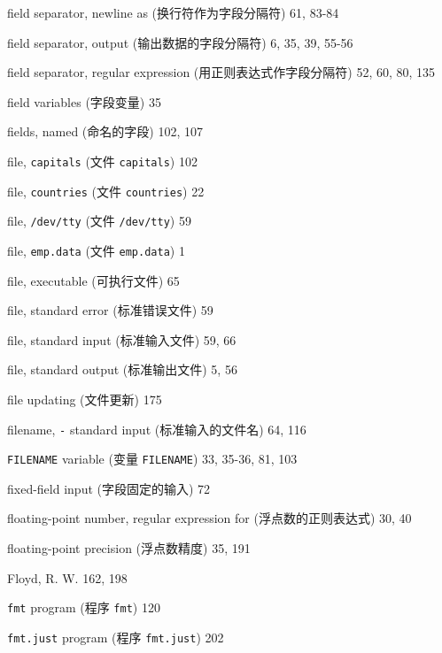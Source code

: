 \begin{multicols}{3}
\hangindent=3pc  field separator, newline as
(换行符作为字段分隔符) 61, 83-84

\hangindent=3pc  field separator, output (输出数据的字段分隔符)
6, 35, 39, 55-56

\hangindent=3pc  field separator, regular expression
(用正则表达式作字段分隔符) 52, 60, 80, 135

\hangindent=3pc  field variables (字段变量) 35

\hangindent=3pc  fields, named (命名的字段) 102, 107

\hangindent=3pc  file, \verb'capitals' (文件 \verb'capitals') 102

\hangindent=3pc  file, \verb'countries' (文件 \verb'countries') 22

\hangindent=3pc  file, \verb'/dev/tty' (文件 \verb'/dev/tty') 59

\hangindent=3pc  file, \verb'emp.data' (文件 \verb'emp.data') 1

\hangindent=3pc  file, executable (可执行文件) 65

\hangindent=3pc  file, standard error (标准错误文件) 59

\hangindent=3pc  file, standard input (标准输入文件) 59, 66

\hangindent=3pc  file, standard output (标准输出文件) 5, 56

\hangindent=3pc  file updating (文件更新) 175

\hangindent=3pc  filename, \verb'-' standard input
(标准输入的文件名) 64, 116

\hangindent=3pc  \verb'FILENAME' variable (变量
\verb'FILENAME') 33, 35-36, 81, 103

\hangindent=3pc  fixed-field input (字段固定的输入) 72

\hangindent=3pc  floating-point number, regular expression for
(浮点数的正则表达式) 30, 40

\hangindent=3pc  floating-point precision (浮点数精度) 35, 191

\hangindent=3pc  Floyd, R. W. 162, 198

\hangindent=3pc  \verb'fmt' program (程序 \verb'fmt') 120

\hangindent=3pc  \verb'fmt.just' program (程序 \verb'fmt.just') 202


\end{multicols}

